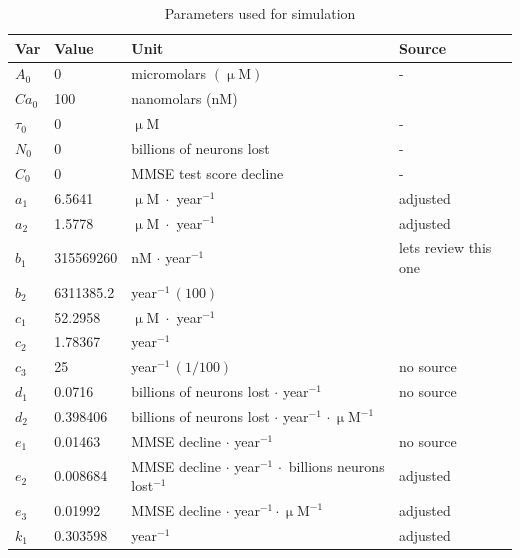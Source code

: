 \documentclass[12pt]{article}
\theoremstyle{definition}
\begin{document}
\begin{table}[h]
    \centering
    \caption{Parameters used for simulation\label{tab:params1}}
    \vspace{0.5em}
    \small
    \begin{tabular}{|l|l|l|l|}
        \hline
        Var & Value & Unit & Source \\
        \hline
        $A_0$ & 0 & micromolars $(\upmu \mathrm M)$ & -  \\
        $Ca_0$ & 100 & nanomolars (nM) & \cite{matikainen2021physiology} \\
        $\tau_0$ & $0$& $\upmu \mathrm M$ & -  \\
        $N_0$ & 0 & billions of neurons lost & - \\
        $C_0$ & 0 & MMSE test score decline & - \\
        $a _{1}$ & 6.5641 & $\upmu \mathrm M \; \cdot$ year$^{-1}$ & \cite{maji2026quantifying} adjusted \\
        $a _{2}$ & 1.5778 & $\upmu \mathrm M \; \cdot$ year$^{-1}$ & \cite{zhang2020mathematical} adjusted \\
        $b _{1}$ & 315569260 & nM $\cdot$ year$^{-1}$ & \cite{zhang2020mathematical} lets review this one \\
        $b _{2}$ & 6311385.2 & year$^{-1} \, (100)$ & \cite{zhang2020mathematical} \\
        $c _{1}$ & 52.2958 & $\upmu \mathrm M \; \cdot$ year$^{-1}$ & \cite{moravveji2025sensitivity} \\
        $c _{2}$ & 1.78367 & year$^{-1}$ & \cite{maji2026quantifying} \\
        $c _{3}$ & 25 & year$^{-1} \, (1/100)$ & no source \\
        $d _{1}$ & 0.0716 & billions of neurons lost $\cdot$ year$^{-1}$ & no source \\
        $d _{2}$ & 0.398406 & billions of neurons lost $\cdot$ year$^{-1}$ $\cdot \, \upmu \mathrm M ^{-1}$  & \cite{moravveji2025sensitivity} \\
        $e _{1}$ & 0.01463 & MMSE decline $\cdot$ year$^{-1}$ & no source \\
        $e _{2}$ & 0.008684 & MMSE decline $\cdot$ year$^{-1} \, \cdot $ billions neurons lost$^{-1}$ & \cite{hao2022optimal} adjusted \\
        $e _{3}$ & 0.01992 & MMSE decline $\cdot$ year$^{-1} \cdot \upmu \mathrm M^{-1}$ & \cite{hao2022optimal} adjusted \\
        $k _{1}$ & 0.303598 & year$^{-1}$ & \cite{maji2026quantifying} adjusted \\

\end{tabular}
\end{table}
\end{document}
